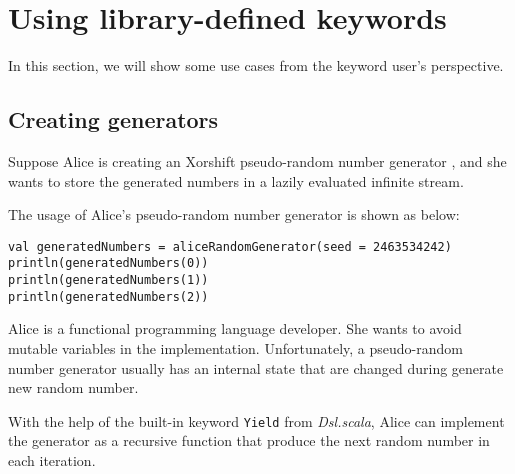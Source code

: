  


\section{Using library-defined keywords}

In this section, we will show some use cases from the keyword user's perspective.

\subsection{Creating generators}

Suppose Alice is creating an Xorshift pseudo-random number generator \cite{marsaglia2003xorshift}, and she wants to store the generated numbers in a lazily evaluated infinite stream. 

The usage of Alice's pseudo-random number generator is shown as below:

\begin{lstlisting}[caption={Using Alice's pseudo-random number generator},label={generatedNumbers}]
val generatedNumbers = aliceRandomGenerator(seed = 2463534242)
println(generatedNumbers(0))
println(generatedNumbers(1))
println(generatedNumbers(2))
\end{lstlisting}

Alice is a functional programming language developer. She wants to avoid mutable variables in the implementation. Unfortunately, a pseudo-random number generator usually has an internal state that are changed during generate new random number.

With the help of the built-in keyword \lstinline{Yield} from \textit{Dsl.scala}, Alice can implement the generator as a recursive function that produce the next random number in each iteration.

